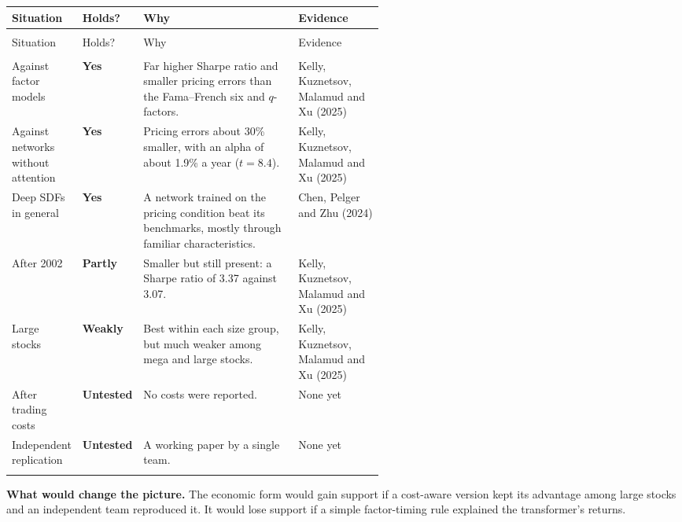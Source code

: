 {\small
\begin{longtable}{@{}>{\raggedright\arraybackslash}p{0.19\linewidth}>{\raggedright\arraybackslash}p{0.13\linewidth}>{\raggedright\arraybackslash}p{}>{\raggedright\arraybackslash}p{0.23\linewidth}@{}}
\toprule
Situation & Holds? & Why & Evidence \\
\midrule
\endfirsthead
\multicolumn{4}{@{}l}{\emph{(continued)}} \\
\toprule
Situation & Holds? & Why & Evidence \\
\midrule
\endhead
\midrule
\multicolumn{4}{r@{}}{\emph{(continued on the next page)}} \\
\endfoot
\bottomrule
\endlastfoot
Against factor models & \textbf{Yes} & Far higher Sharpe ratio and smaller pricing errors than the Fama--French six and $q$-factors. & Kelly, Kuznetsov, Malamud and Xu (2025) \\*
\addlinespace[3pt]
Against networks without attention & \textbf{Yes} & Pricing errors about 30\% smaller, with an alpha of about 1.9\% a year ($t = 8.4$). & Kelly, Kuznetsov, Malamud and Xu (2025) \\*
\addlinespace[3pt]
Deep SDFs in general & \textbf{Yes} & A network trained on the pricing condition beat its benchmarks, mostly through familiar characteristics. & Chen, Pelger and Zhu (2024) \\*
\addlinespace[3pt]
After 2002 & \textbf{Partly} & Smaller but still present: a Sharpe ratio of 3.37 against 3.07. & Kelly, Kuznetsov, Malamud and Xu (2025) \\*
\addlinespace[3pt]
Large stocks & \textbf{Weakly} & Best within each size group, but much weaker among mega and large stocks. & Kelly, Kuznetsov, Malamud and Xu (2025) \\*
\addlinespace[3pt]
After trading costs & \textbf{Untested} & No costs were reported. & None yet \\*
\addlinespace[3pt]
Independent replication & \textbf{Untested} & A working paper by a single team. & None yet \\*
\end{longtable}
\addtocounter{table}{-1}%
}

\textbf{What would change the picture.} The economic form would gain support if a cost-aware version kept its advantage among large stocks and an independent team reproduced it. It would lose support if a simple factor-timing rule explained the transformer's returns.

